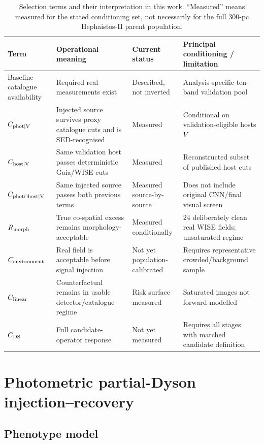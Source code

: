 \documentclass[fleqn,usenatbib]{mnras}
\begin{document}
\begin{table}
\centering
\caption{Selection terms and their interpretation in this work. ``Measured'' means measured for the stated conditioning set, not necessarily for the full 300-pc Hephaistos-II parent population.}
\label{tab:semantic}
\begin{tabularx}{\textwidth}{p{} X p{} p{}}
\toprule
Term & Operational meaning & Current status & Principal conditioning / limitation\\
\midrule
Baseline catalogue availability & Required real measurements exist & Described, not inverted & Analysis-specific ten-band validation pool\\
$C_{\rm phot\mid V}$ & Injected source survives proxy catalogue cuts and is SED-recognised & Measured & Conditional on validation-eligible hosts $V$\\
$C_{\rm host\mid V}$ & Same validation host passes deterministic Gaia/WISE cuts & Measured & Reconstructed subset of published host cuts\\
$C_{\rm phot\cap host\mid V}$ & Same injected source passes both previous terms & Measured source-by-source & Does not include original CNN/final visual screen\\
$R_{\rm morph}$ & True co-spatial excess remains morphology-acceptable & Measured conditionally & 24 deliberately clean real WISE fields; unsaturated regime\\
$C_{\rm environment}$ & Real field is acceptable before signal injection & Not yet population-calibrated & Requires representative crowded/background sample\\
$C_{\rm linear}$ & Counterfactual remains in usable detector/catalogue regime & Risk surface measured & Saturated images not forward-modelled\\
$C_{\rm DS}$ & Full candidate-operator response & Not yet measured & Requires all stages with matched candidate definition\\
\bottomrule
\end{tabularx}
\end{table}

\section{Photometric partial-Dyson injection--recovery}
\label{sec:phot}

\subsection{Phenotype model}
\end{document}
